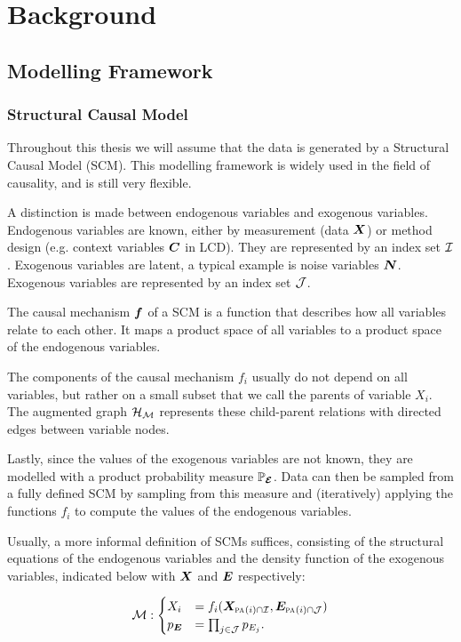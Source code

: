 \newpage
\section{Background}

\subsection{Modelling Framework}

\subsubsection{Structural Causal Model}
Throughout this thesis we will assume that the data is generated by a Structural Causal Model (SCM). This modelling framework is widely used in the field of causality, and is still very flexible. 

A distinction is made between endogenous variables and exogenous variables. Endogenous variables are known, either by measurement (data $\bm{X}$) or method design (e.g. context variables $\bm{C}$ in LCD). They are represented by an index set $\mathcal{I}$. Exogenous variables are latent, a typical example is noise variables $\bm{N}$. Exogenous variables are represented by an index set $\mathcal{J}$.

The causal mechanism $\bm{f}$ of a SCM is a function that describes how all variables relate to each other. It maps a product space of all variables to a product space of the endogenous variables. 

The components of the causal mechanism $f_i$ usually do not depend on all variables, but rather on a small subset that we call the parents of variable $X_i$. The augmented graph $\mathcal{H}_{\mathcal{M}}$ represents these child-parent relations with directed edges between variable nodes.

Lastly, since the values of the exogenous variables are not known, they are modelled with a product probability measure $\mathbb{P}_{\bm{\mathcal{E}}}$. Data can then be sampled from a fully defined SCM by sampling from this measure and (iteratively) applying the functions $f_i$ to compute the values of the endogenous variables.

Usually, a more informal definition of SCMs suffices, consisting of the structural equations of the endogenous variables and the density function of the exogenous variables, indicated below with $\bm{X}$ and $\bm{E}$ respectively:

$$\mathcal{M}: \begin{cases}
    X_i &= f_i(\bm{X}_{\text{\normalfont\scshape pa}_{}(i) \cap \mathcal{I}}, \bm{E}_{\text{\normalfont\scshape pa}_{}(i) \cap \mathcal{J}}) \\
    p_{\bm{E}} & = \prod_{j\in\mathcal{J}} p_{E_j}.
\end{cases}$$

